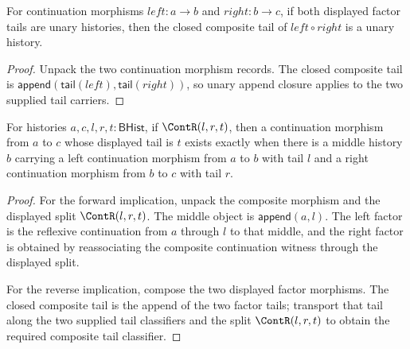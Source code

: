 \begin{theorem}
\label{thm:continuation-morphism-comp-tail-unary-closed}
For continuation morphisms $left:a\to b$ and $right:b\to c$, if both displayed
factor tails are unary histories, then the closed composite tail of
$left\circ right$ is a unary history.
\end{theorem}
\begin{proof}
Unpack the two continuation morphism records. The closed composite tail is
$\mathsf{append}(\mathsf{tail}(left),\mathsf{tail}(right))$, so unary append
closure applies to the two supplied tail carriers.
\end{proof}

\begin{theorem}
\label{thm:continuation-morphism-tail-factorization-iff}
For histories $a,c,l,r,t:\mathsf{BHist}$, if $\ContR(l,r,t)$, then a
continuation morphism from $a$ to $c$ whose displayed tail is $t$ exists
exactly when there is a middle history $b$ carrying a left continuation
morphism from $a$ to $b$ with tail $l$ and a right continuation morphism from
$b$ to $c$ with tail $r$.
\end{theorem}
\begin{proof}
For the forward implication, unpack the composite morphism and the displayed
split $\ContR(l,r,t)$. The middle object is $\mathsf{append}(a,l)$. The left
factor is the reflexive continuation from $a$ through $l$ to that middle, and
the right factor is obtained by reassociating the composite continuation
witness through the displayed split.

For the reverse implication, compose the two displayed factor morphisms. The
closed composite tail is the append of the two factor tails; transport that
tail along the two supplied tail classifiers and the split $\ContR(l,r,t)$ to
obtain the required composite tail classifier.
\end{proof}


